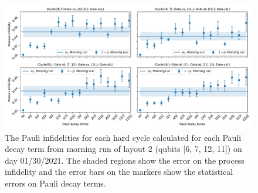 \begin{figure}[ht!]
    \includegraphics[scale=0.56]{CBPauliInfidelities_30_01_2021_MorningRun_Layout2_Cycle1_2_3_4.pdf}
    \caption{The Pauli infidelities for each hard cycle calculated for each Pauli decay term from morning run of layout 2 (qubits [6, 7, 12, 11]) on day 01/30/2021. The shaded regions show the error on the process infidelity and the error bars on the markers show the statistical errors on Pauli decay terms. }
    \label{fig:PauliInfidelities30Morning_Story7}
\end{figure}


